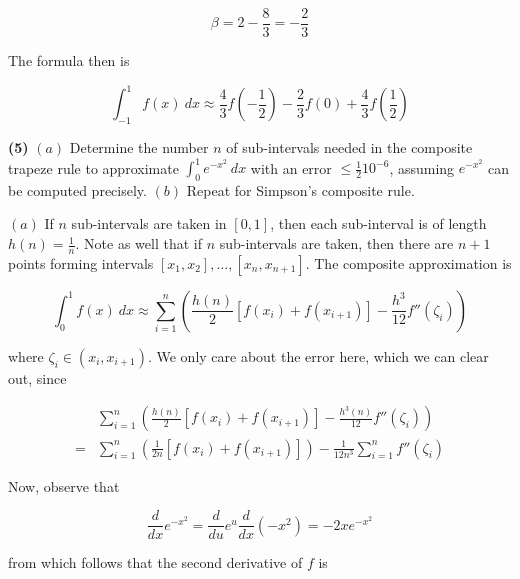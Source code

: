 \documentclass[12pt]{article}
\theoremstyle{definition}
\begin{document}
\begin{equation*}
    \beta = 2 - \frac{8}{3} = -\frac{2}{3}
\end{equation*}

The formula then is 

\begin{equation*}
    \int_{-1}^1 f(x) ~ dx \approx \frac{4}{3}f\left( -\frac{1}{2} \right) -
    \frac{2}{3}f(0) + \frac{4}{3}f\left( \frac{1}{2} \right) 
\end{equation*}

\pagebreak 

\begin{shaded}
    \textbf{(5)} $(a)$ Determine the number $n$ of sub-intervals needed in the
    composite trapeze rule to approximate $\int_0^1 e^{-x^2} ~ dx$ with an error
    $\leq \frac{1}{2} 10^{-6}$, assuming $e^{-x^2}$ can be computed precisely.
    $(b)$ Repeat for Simpson's composite rule.
\end{shaded}

$(a)$ If $n$ sub-intervals are taken in $[0, 1]$, then each sub-interval is of
length $h(n) = \frac{1}{n}$. Note as well that if $n$ sub-intervals are taken,
then there are $n + 1$ points forming intervals $[x_1, x_2],  \ldots,
[x_n, x_{n+1}]$. The composite approximation is

\begin{equation*}
    \int_0^1 f(x) ~ dx \approx 
    \sum_{i=1}^{n} \left(\frac{h(n)}{2}\left[ f(x_i) +
            f(x_{i+1})
    \right]  - \frac{h^3}{12}f''(\zeta_i)\right)
\end{equation*}

where $\zeta_i \in (x_i, x_{i+1})$. We only care about the error here, which we
can clear out, since 

\begin{align*}
    &\sum_{i=1}^{n} \left(\frac{h(n)}{2}\left[ f(x_i) +
            f(x_{i+1})
    \right]  - \frac{h^3(n)}{12}f''(\zeta_i)\right) \\ 
    =&\sum_{i=1}^n \left( \frac{1}{2n}\left[ f(x_i) + f(x_{i+1}) \right]
    \right) - \frac{1}{12n^3} \sum_{i=1}^n f''(\zeta_i)
\end{align*}

Now, observe that 

\begin{equation*}
    \frac{d}{dx} e^{-x^2} = \frac{d}{du} e^u \frac{d}{dx} (-x^2) = -2xe^{-x^2}
\end{equation*}

from which follows that the second derivative of $f$ is 
\end{document}
